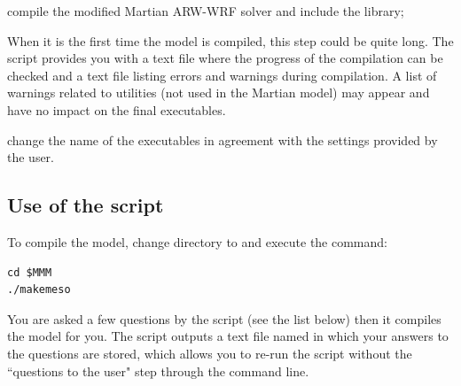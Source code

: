 \begin{citemize}
\begin{finger}
\end{finger}
\item compile the modified Martian ARW-WRF solver and include the  library; 
\begin{finger}
\item When it is the first time the model is compiled, this step could be quite long. The  script provides you with a  text file where the progress of the compilation can be checked and a  text file listing errors and warnings during compilation. A list of warnings related to  utilities (not used in the Martian model) may appear and have no impact on the final executables.
\end{finger}
\item change the name of the executables in agreement with the
settings provided by the user.
\end{citemize}

\sk
\subsection{Use of the  script}

\sk
To compile the model, change directory to  and execute the  command:

\begin{verbatim}
cd $MMM
./makemeso
\end{verbatim}

\sk
You are asked a few questions by the  script (see the list below) then it compiles the model for you. The script outputs a text file named  in which your answers to the questions are stored, which allows you to re-run the script without the ``questions to the user" step through the  command line. 


